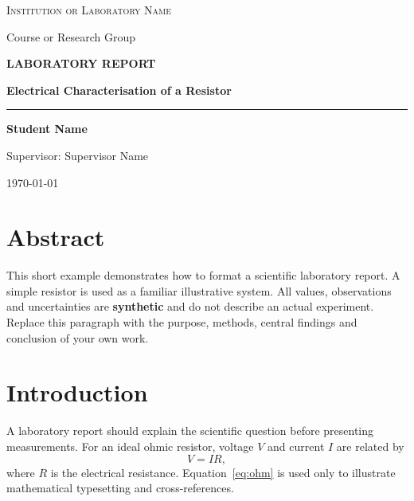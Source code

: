 \documentclass[11pt,a4paper]{article}
\newcommand{\reporttitle}{Electrical Characterisation of a Resistor}
\newcommand{\reportauthor}{Student Name}
\newcommand{\reportinstitution}{Institution or Laboratory Name}
\newcommand{\reportcourse}{Course or Research Group}
\newcommand{\reportsupervisor}{Supervisor Name}
\newcommand{\reportdate}{\today}
\begin{document}
\hypersetup{pageanchor=false}
\begin{titlepage}
  \centering
  \vspace*{2cm}
  {\large\color{reportmuted}\scshape\reportinstitution\par}
  \vspace{0.35cm}
  {\normalsize\color{reportmuted}\reportcourse\par}
  \vspace{2.7cm}
  {\small\bfseries\color{reportaccent}\MakeUppercase{Laboratory Report}\par}
  \vspace{0.6cm}
  {\Huge\bfseries\reporttitle\par}
  \vspace{0.8cm}
  {\color{reportaccent}\rule{0.25\textwidth}{1.4pt}\par}
  \vfill
  {\large\bfseries\reportauthor\par}
  \vspace{0.35cm}
  {\normalsize\color{reportmuted}Supervisor: \reportsupervisor\par}
  \vspace{0.5cm}
  {\normalsize\reportdate\par}
  \vspace{1.0cm}
\end{titlepage}
\hypersetup{pageanchor=true}

\section*{Abstract}
This short example demonstrates how to format a scientific laboratory report.
A simple resistor is used as a familiar illustrative system. All values,
observations and uncertainties are \textbf{synthetic} and do not describe an
actual experiment. Replace this paragraph with the purpose, methods, central
findings and conclusion of your own work.

\section{Introduction}
\label{sec:introduction}
A laboratory report should explain the scientific question before presenting
measurements. For an ideal ohmic resistor, voltage \(V\) and current \(I\)
are related by
\begin{equation}
    V = IR,
    \label{eq:ohm}
\end{equation}
where \(R\) is the electrical resistance. Equation~\eqref{eq:ohm} is used
only to illustrate mathematical typesetting and cross-references.
\end{document}
